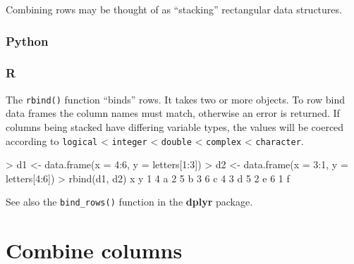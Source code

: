 \documentclass[
]{book}
\newenvironment{Shaded}{\begin{snugshade}}{\end{snugshade}}
\newcommand{\AttributeTok}[1]{\textcolor[rgb]{0.77,0.63,0.00}{#1}}
\newcommand{\DecValTok}[1]{\textcolor[rgb]{0.00,0.00,0.81}{#1}}
\newcommand{\FunctionTok}[1]{\textcolor[rgb]{0.00,0.00,0.00}{#1}}
\newcommand{\NormalTok}[1]{#1}
\newcommand{\OtherTok}[1]{\textcolor[rgb]{0.56,0.35,0.01}{#1}}
\newcommand{\SpecialCharTok}[1]{\textcolor[rgb]{0.00,0.00,0.00}{#1}}
\begin{document}
Combining rows may be thought of as ``stacking'' rectangular data structures.

\hypertarget{python-23}{%
\subsubsection*{Python}\label{python-23}}

\hypertarget{r-23}{%
\subsubsection*{R}\label{r-23}}

The \texttt{rbind()} function ``binds'' rows. It takes two or more objects. To row bind data frames the column names must match, otherwise an error is returned. If columns being stacked have differing variable types, the values will be coerced according to \texttt{logical} \textless{} \texttt{integer} \textless{} \texttt{double} \textless{} \texttt{complex} \textless{} \texttt{character}.

\begin{Shaded}
\begin{Highlighting}[]
\SpecialCharTok{\textgreater{}}\NormalTok{ d1 }\OtherTok{\textless{}{-}} \FunctionTok{data.frame}\NormalTok{(}\AttributeTok{x =} \DecValTok{4}\SpecialCharTok{:}\DecValTok{6}\NormalTok{, }\AttributeTok{y =}\NormalTok{ letters[}\DecValTok{1}\SpecialCharTok{:}\DecValTok{3}\NormalTok{])}
\SpecialCharTok{\textgreater{}}\NormalTok{ d2 }\OtherTok{\textless{}{-}} \FunctionTok{data.frame}\NormalTok{(}\AttributeTok{x =} \DecValTok{3}\SpecialCharTok{:}\DecValTok{1}\NormalTok{, }\AttributeTok{y =}\NormalTok{ letters[}\DecValTok{4}\SpecialCharTok{:}\DecValTok{6}\NormalTok{])}
\SpecialCharTok{\textgreater{}} \FunctionTok{rbind}\NormalTok{(d1, d2)}
\NormalTok{  x y}
\DecValTok{1} \DecValTok{4}\NormalTok{ a}
\DecValTok{2} \DecValTok{5}\NormalTok{ b}
\DecValTok{3} \DecValTok{6}\NormalTok{ c}
\DecValTok{4} \DecValTok{3}\NormalTok{ d}
\DecValTok{5} \DecValTok{2}\NormalTok{ e}
\DecValTok{6} \DecValTok{1}\NormalTok{ f}
\end{Highlighting}
\end{Shaded}

See also the \texttt{bind\_rows()} function in the \textbf{dplyr} package.

\hypertarget{combine-columns}{%
\section{Combine columns}\label{combine-columns}}
\end{document}
